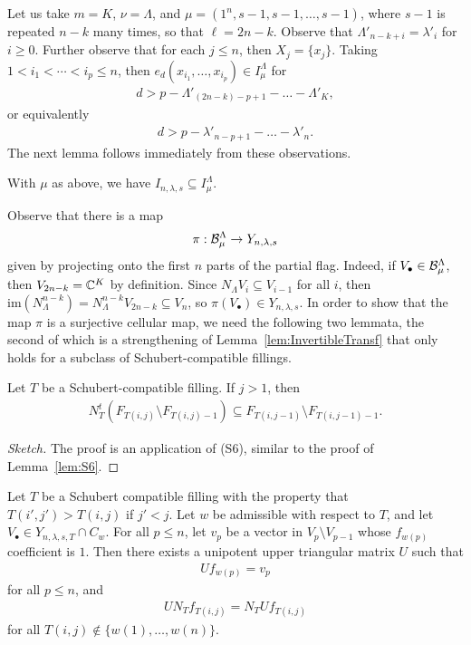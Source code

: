 \documentclass[12pt]{amsart}
\newcommand{\la}{\lambda}
\newcommand{\im}{\mathrm{im}}
\begin{document}
Let us take $m = K$, $\nu = \Lambda$, and $\mu = (1^n,s-1,s-1,\dots, s-1)$, where $s-1$ is repeated $n-k$ many times, so that $\ell = 2n-k$. Observe that $\Lambda'_{n-k+i} = \la'_i$ for $i\geq 0$. Further observe that for each $j\leq n$, then $X_j = \{x_j\}$. Taking $1<i_1<\cdots <i_p \leq n$, then $e_d(x_{i_1},\dots, x_{i_p})\in I_\mu^\Lambda$ for
\begin{align}
d > p-\Lambda'_{(2n-k)-p+1} - \dots -\Lambda'_K,
\end{align}
or equivalently
\begin{align}
d > p-\la'_{n-p+1} - \dots - \la'_n.
\end{align}
The next lemma follows immediately from these observations.
\begin{lemma}\label{lem:IdealContainment}
With $\mu$ as above, we have $I_{n,\la,s} \subseteq I_\mu^\Lambda$.
\end{lemma}



Observe that there is a map
\begin{align}
\pi : \cB_\mu^\Lambda \rightarrow Y_{n,\la,s}
\end{align}
given by projecting onto the first $n$ parts of the partial flag. Indeed, if $V_\bullet \in \mathcal{B}_\mu^\Lambda$, then $V_{2n-k} = \mathbb{C}^K$ by definition. Since $N_\Lambda V_i\subseteq V_{i-1}$ for all $i$, then $\im(N_\Lambda^{n-k}) = N_\Lambda^{n-k}V_{2n-k} \subseteq V_n$, so $\pi(V_\bullet) \in Y_{n,\la,s}$. 
In order to show that the map $\pi$ is a surjective cellular map, we need the following two lemmata, the second of which is a strengthening of Lemma~\ref{lem:InvertibleTransf} that only holds for a subclass of Schubert-compatible fillings.





\begin{lemma}\label{lem:LeadingTerm}
Let $T$ be a Schubert-compatible filling. If $j>1$, then
\begin{align}
    N^t_T(F_{T(i,j)}\setminus F_{T(i,j)-1})\subseteq F_{T(i,j-1)}\setminus F_{T(i,j-1)-1}.
\end{align} 
\end{lemma}
\begin{proof}[Sketch]
The proof is an application of (S6), similar to the proof of Lemma~\ref{lem:S6}.
\end{proof}


\begin{lemma}\label{lem:TechnicalLemmaUnipotent}
Let $T$ be a Schubert compatible filling with the property that $T(i',j')>T(i,j)$ if $j'<j$. Let $w$ be admissible with respect to $T$, and let $V_\bullet\in Y_{n,\la,s,T}\cap C_w$. For all $p\leq n$, let $v_p$ be a vector in $V_p\setminus V_{p-1}$ whose $f_{w(p)}$ coefficient is $1$. Then there exists a unipotent upper triangular matrix $U$ such that 
\begin{align}\label{eq:UnipotentEq1}
U f_{w(p)} = v_p
\end{align}
for all $p\leq n$, and
\begin{align}\label{eq:UnipotentEq2}
UN_T f_{T(i,j)} = N_TU f_{T(i,j)}
\end{align}
for all $T(i,j) \notin\{w(1),\dots, w(n)\}$.
\end{lemma}
\end{document}
